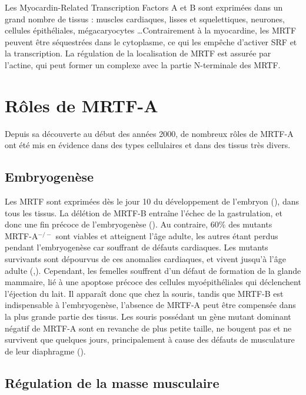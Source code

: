 \documentclass{report}
\begin{document}
Les Myocardin-Related Transcription Factors A et B sont exprimées dans un grand nombre de tissus : muscles cardiaques, lisses et squelettiques, neurones, cellules épithéliales, mégacaryocytes \dots Contrairement à la myocardine, les MRTF peuvent être séquestrées dans le cytoplasme, ce qui les empêche d'activer SRF et la transcription. La régulation de la localisation de MRTF est assurée par l'actine, qui peut former un complexe avec la partie N-terminale des MRTF. 




\section{Rôles de MRTF-A}
Depuis sa découverte au début des années 2000, de nombreux rôles de MRTF-A ont été mis en évidence dans des types cellulaires et dans des tissus très divers. 
\subsection{Embryogenèse}

Les MRTF sont exprimées dès le jour 10 du développement de l'embryon (\cite{wang_potentiation_2002}), dans tous les tissus. La délétion de MRTF-B entraîne l'échec de la gastrulation, et donc une fin précoce de l'embryogenèse (\cite{kalita_mkls:_2012}). Au contraire, 60\% des mutants MRTF-A$^{-/-}$ sont viables et atteignent l'âge adulte, les autres étant perdus pendant l'embryogenèse car souffrant de défauts cardiaques. Les mutants survivants sont dépourvus de ces anomalies cardiaques, et vivent jusqu'à l'âge adulte (\cite{li_requirement_2006},\cite{sun_acute_2006}). Cependant, les femelles souffrent d'un défaut de formation de la glande mammaire,  lié à une apoptose précoce des cellules myoépithéliales qui déclenchent l'éjection du lait. Il apparaît donc que chez la souris, tandis que MRTF-B est indispensable à l'embryogenèse, l'absence de MRTF-A peut être compensée dans la plus grande partie des tissus. 
Les souris possédant un gène mutant dominant négatif de MRTF-A sont en revanche de plus petite taille, ne bougent pas et ne survivent que quelques jours, principalement à cause des défauts de musculature de leur diaphragme (\cite{li_requirement_2005}). 

\subsection{Régulation de la masse musculaire}
\end{document}
